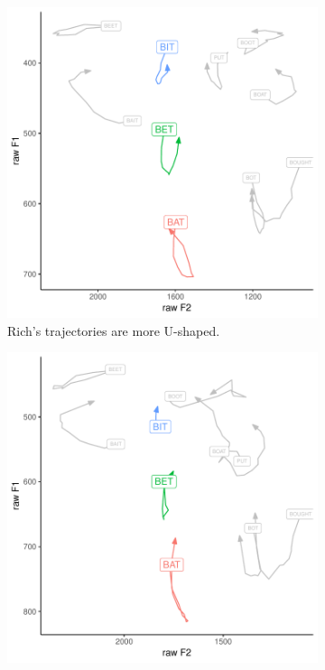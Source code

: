 \begin{figure}[tb!]
    \centering
    \hspace{\fill}
    \begin{subfigure}[t]{2.925in} %
        \centering
        \includegraphics[width = \textwidth]{Figures/example_plots/51-Rich_avg_traj.pdf}
        \caption{Rich's trajectories are more U-shaped.}
        \label{fig:avg_traj_rich}
    \end{subfigure}
    \hspace{\fill}
    \begin{subfigure}[t]{2.925in}
        \centering
        \includegraphics[width = \textwidth]{Figures/example_plots/54-Amber_avg_traj.pdf}

\end{subfigure}
\end{figure}
